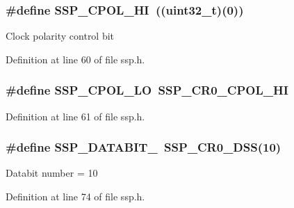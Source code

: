 \subsubsection[{\texorpdfstring{S\+S\+P\+\_\+\+C\+P\+O\+L\+\_\+\+HI}{SSP_CPOL_HI}}]{\setlength{\rightskip}{0pt plus 5cm}\#define S\+S\+P\+\_\+\+C\+P\+O\+L\+\_\+\+HI~(({\bf uint32\+\_\+t})(0))}\hypertarget{group___s_s_p___public___macros_gaf64aec37a92ca6c14c23af6fc0052ccb}{}\label{group___s_s_p___public___macros_gaf64aec37a92ca6c14c23af6fc0052ccb}
Clock polarity control bit 

Definition at line 60 of file ssp.\+h.

\subsubsection[{\texorpdfstring{S\+S\+P\+\_\+\+C\+P\+O\+L\+\_\+\+LO}{SSP_CPOL_LO}}]{\setlength{\rightskip}{0pt plus 5cm}\#define S\+S\+P\+\_\+\+C\+P\+O\+L\+\_\+\+LO~{\bf S\+S\+P\+\_\+\+C\+R0\+\_\+\+C\+P\+O\+L\+\_\+\+HI}}\hypertarget{group___s_s_p___public___macros_ga1e10eccdb2b293607764028aab1b98a9}{}\label{group___s_s_p___public___macros_ga1e10eccdb2b293607764028aab1b98a9}


Definition at line 61 of file ssp.\+h.

\subsubsection[{\texorpdfstring{S\+S\+P\+\_\+\+D\+A\+T\+A\+B\+I\+T\+\_\+10}{SSP_DATABIT_10}}]{\setlength{\rightskip}{0pt plus 5cm}\#define S\+S\+P\+\_\+\+D\+A\+T\+A\+B\+I\+T\+\_~{\bf S\+S\+P\+\_\+\+C\+R0\+\_\+\+D\+SS}(10)}\hypertarget{group___s_s_p___public___macros_ga8e8220666e083d725cb5ca12863e3398}{}\label{group___s_s_p___public___macros_ga8e8220666e083d725cb5ca12863e3398}
Databit number = 10 

Definition at line 74 of file ssp.\+h.


